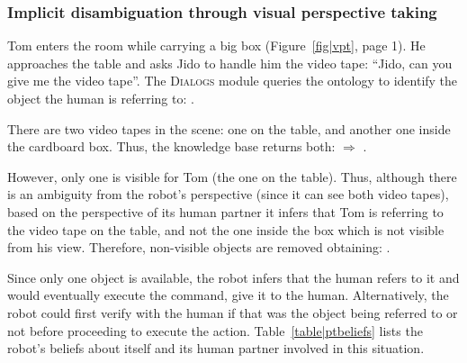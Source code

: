 \subsubsection{Implicit disambiguation through visual perspective taking}

Tom enters the room while carrying a big box (Figure~\ref{fig|vpt}, page 1). He
approaches the table and asks Jido to handle him the video tape: ``Jido, can
you give me the video tape''. The \textsc{Dialogs} module queries the ontology to
identify the object the human is referring to: . 

There are two video tapes in the scene: one on the table, and another one
inside the cardboard box. Thus, the knowledge base returns both: $\Rightarrow$
. 

However, only one is visible for Tom (the one on the
table). Thus, although there is an ambiguity from the robot's perspective
(since it can see both video tapes), based on the perspective of its human
partner it infers that Tom is referring to the video tape on the table, and not
the one inside the box which is not visible from his view. Therefore,
non-visible objects are removed obtaining: .

Since only one object is available, the robot infers
that the human refers to it and would eventually execute the command, \ie give
it to the human. Alternatively, the robot could first verify with the human if
that was the object being referred to or not before proceeding to execute the
action. Table~\ref{table|ptbeliefs} lists the robot's beliefs about itself and
its human partner involved in this situation.

